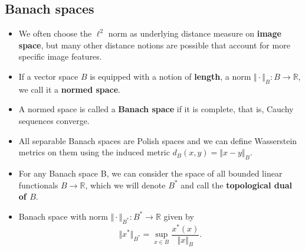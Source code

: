 \documentclass[landscape,headrule,footrule]{foils}
\begin{document}
\subsection{Banach spaces}
\tableofcontents
\begin{frame}
\begin{flushleft}
\begin{itemize}
\item We often choose the $\ell^2$ norm as underlying distance measure on \textbf{image space}, but many other distance notions are possible that account for more specific image features.
\\
\item If a vector space $B$ is equipped with a notion of \textbf{length}, a norm $\Vert \cdot \Vert_B :B\rightarrow \mathbb{R}$, we call it a \textbf{normed space}.
\\
\item A normed space is called a \textbf{Banach space} if it is complete, that is, Cauchy sequences converge.
\\
\item All separable Banach spaces are Polish spaces and we can define Wasserstein metrics on them using the induced metric $d_B (x,y)= \Vert x-y \Vert_B$.
\end{itemize}
\end{flushleft}
\end{frame}

\begin{frame}
\begin{flushleft}
\begin{itemize}
\item For any Banach space B, we can consider the space of all bounded linear functionals $B \rightarrow \mathbb{R}$, which we will denote $B^*$ and call the \textbf{topological dual of $B$}.
\\
\item Banach space with norm $\Vert \cdot \Vert_{B^*} :B^* \rightarrow \mathbb{R}$ given by 
\begin{equation}
\Vert x^* \Vert_{B^*} = \mathop{\sup}_{x \in B} \dfrac{x^*(x)}{\Vert x \Vert_B}.
\end{equation}
\end{itemize}
\end{flushleft}
\end{frame}
\end{document}
